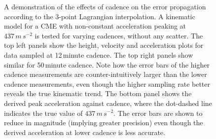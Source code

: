\documentclass[structabstract]{aa}
\begin{document}
\begin{figure}[!t]
\caption{A demonstration of the effects of cadence on the error propagation according to the 3-point Lagrangian interpolation. A kinematic model for a CME with non-constant acceleration peaking at $437\,m\,s^{-2}$ is tested for varying cadences, without any scatter. The top left panels show the height, velocity and acceleration plots for data sampled at 12\,minute cadence. The top right panels show similar for 50\,minute cadence. Note how the error bars of the higher cadence measurements are counter-intuitively larger than the lower cadence measurements, even though the higher sampling rate better reveals the true kinematic trend. The bottom panel shows the derived peak acceleration against cadence, where the dot-dashed line indicates the true value of $437\,m\,s^{-2}$. The error bars are shown to reduce in magnitude (implying greater precision) even though the derived acceleration at lower cadence is less accurate.}
\label{fig_cadence_hva}
\end{figure}
\end{document}
